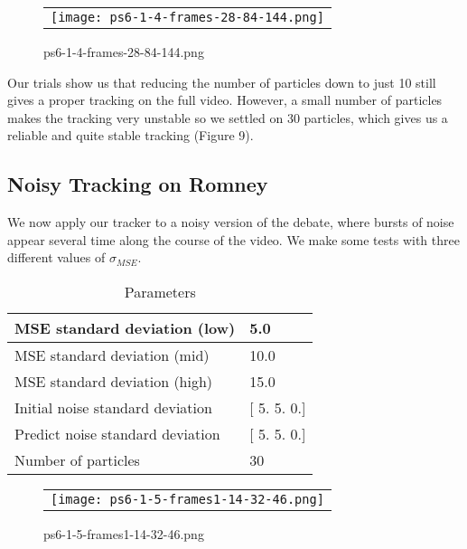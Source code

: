 \documentclass[a4paper,11pt]{article}
\begin{document}
\begin{figure}[H]
\begin{center}
\begin{tabular}{c}
	\texttt{[image: ps6-1-4-frames-28-84-144.png]}\\
\end{tabular}
\end{center}
\caption{ps6-1-4-frames-28-84-144.png}
\label{ps-6-4-a}
\end{figure}


Our trials show us that reducing the number of particles down to just 10 still gives a proper tracking on the full video. However, a small number of particles makes the tracking very unstable so we settled on 30 particles, which gives us a reliable and quite stable tracking (Figure 9).

\subsection{Noisy Tracking on Romney}



We now apply our tracker to a noisy version of the debate, where bursts of noise appear several time along the course of the video. We make some tests with three different values of $\sigma_{MSE}$.

\begin{table}[H]
\centering
\caption{Parameters}
\begin{tabular}{|l|l|}
\hline
    MSE standard deviation (low)  &   5.0 \\ \hline
    MSE standard deviation (mid)  &  10.0 \\ \hline
    MSE standard deviation (high)  &  15.0 \\ \hline
    Initial noise standard deviation &  [ 5.  5.  0.] \\ \hline
    Predict noise standard deviation &  [ 5.  5.  0.] \\ \hline
    Number of particles &  30 \\ \hline
\end{tabular}
\end{table}

\begin{figure}[H]
\begin{center}
\begin{tabular}{c}
	\texttt{[image: ps6-1-5-frames1-14-32-46.png]}\\
\end{tabular}
\end{center}
\caption{ps6-1-5-frames1-14-32-46.png}
\label{ps-6-5-a}
\end{figure}
\end{document}
